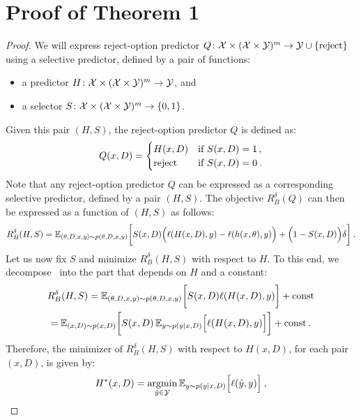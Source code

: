 \onecolumn
\appendix
\section*{Proof of Theorem 1}


\begin{proof}
We will express reject-option predictor $Q\colon{\cal X}\times({\cal X}\times{\cal Y})^m\rightarrow{\cal Y}\cup\{\text{reject}\}$ using a selective predictor, defined by a pair of functions: 
\begin{itemize}
    \item a predictor $H\colon{\cal X}\times({\cal X}\times{\cal Y})^m\rightarrow{\cal Y}$, and 
    \item a selector $S\colon{\cal X}\times({\cal X}\times{\cal Y})^m\rightarrow\{0,1\}$. 
\end{itemize}   
%
Given this pair $(H,S)$, the reject-option predictor $Q$ is defined as:
\begin{equation}
\label{equ:QviaSelPred}
   Q(x,D) = \begin{cases}
   H(x,D) & \text{if } S(x,D) = 1\,, \\
   {\rm reject} & \text{if } S(x,D) = 0 \:.
   \end{cases}     
\end{equation}
%
Note that any reject-option predictor $Q$ can be expressed as a corresponding selective predictor, defined by a pair $(H,S)$. The objective $R_B^\delta(Q)$ can then be expressed as a function of $(H,S)$ as follows:
\begin{equation}
  \label{equ:riskAsFunHS}
R^\delta_B(H,S)  =  {\mathbb{E}}_{(\theta,D,x,y)\sim p(\theta,D,x,y)}\bigg [ S(x,D)\Big( \ell(H(x,D),y)-\ell(h(x,\theta),y) \Big )+\Big(1-S(x,D)\Big )\delta \bigg ]\:.\\
\end{equation}
%
Let us now fix $S$ and minimize $R^\delta_B(H,S)$ with respect to $H$. To this end, we decompose~ into the part that depends on $H$ and a constant:
\begin{multline*}
R^\delta_B(H,S)  =  {\mathbb{E}}_{(\theta,D,x,y)\sim p(\theta,D,x,y)}\bigg [ S(x,D)\ell(H(x,D),y) \bigg ] + \text{const} \\
=  {\mathbb{E}}_{(x,D)\sim p(x,D)} \bigg [ S(x,D)\, {\mathbb{E}}_{y\sim p(y|x,D)} \Big [ \ell(H(x,D),y) \Big] \bigg ] + \text{const} \:.
\end{multline*}
%
Therefore, the minimizer of $R^\delta_B(H,S)$ with respect to $H(x,D)$, for each pair $(x,D)$, is given by:
\begin{equation}
\label{equ:OptH}
  H^*(x,D) = \argmin_{\hat{y}\in\SY} \EE_{y\sim p(y|x,D)} \Big [ \ell(\hat{y},y) \Big] \:,

\end{equation}
\end{proof}
